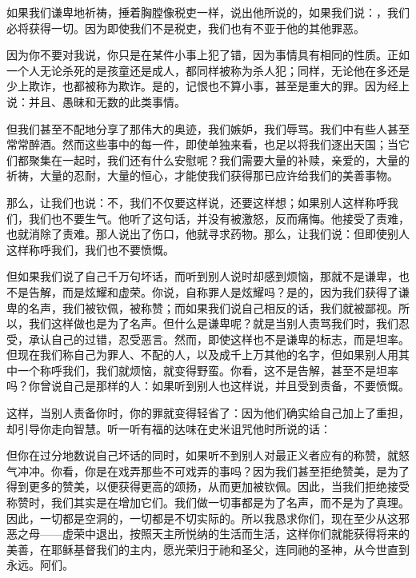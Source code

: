 如果我们谦卑地祈祷，捶着胸膛像税吏一样，说出他所说的，如果我们说：，我们必将获得一切。因为即使我们不是税吏，我们也有不亚于他的其他罪恶。\par

因为你不要对我说，你只是在某件小事上犯了错，因为事情具有相同的性质。正如一个人无论杀死的是孩童还是成人，都同样被称为杀人犯；同样，无论他在多还是少上欺诈，也都被称为欺诈。是的，记恨也不算小事，甚至是重大的罪。因为经上说：并且、愚昧和无数的此类事情。\par

但我们甚至不配地分享了那伟大的奥迹，我们嫉妒，我们辱骂。我们中有些人甚至常常醉酒。然而这些事中的每一件，即使单独来看，也足以将我们逐出天国；当它们都聚集在一起时，我们还有什么安慰呢？我们需要大量的补赎，亲爱的，大量的祈祷，大量的忍耐，大量的恒心，才能使我们获得那已应许给我们的美善事物。\par

那么，让我们也说：不，我们不仅要这样说，还要这样想；如果别人这样称呼我们，我们也不要生气。他听了这句话，并没有被激怒，反而痛悔。他接受了责难，也就消除了责难。那人说出了伤口，他就寻求药物。那么，让我们说：但即使别人这样称呼我们，我们也不要愤慨。\par

但如果我们说了自己千万句坏话，而听到别人说时却感到烦恼，那就不是谦卑，也不是告解，而是炫耀和虚荣。你说，自称罪人是炫耀吗？是的，因为我们获得了谦卑的名声，我们被钦佩，被称赞；而如果我们说自己相反的话，我们就被鄙视。所以，我们这样做也是为了名声。但什么是谦卑呢？就是当别人责骂我们时，我们忍受，承认自己的过错，忍受恶言。然而，即使这样也不是谦卑的标志，而是坦率。但现在我们称自己为罪人、不配的人，以及成千上万其他的名字，但如果别人用其中一个称呼我们，我们就烦恼，就变得野蛮。你看，这不是告解，甚至不是坦率吗？你曾说自己是那样的人：如果听到别人也这样说，并且受到责备，不要愤慨。\par

这样，当别人责备你时，你的罪就变得轻省了：因为他们确实给自己加上了重担，却引导你走向智慧。听一听有福的达味在史米诅咒他时所说的话：\par

但你在过分地数说自己坏话的同时，如果听不到别人对最正义者应有的称赞，就怒气冲冲。你看，你是在戏弄那些不可戏弄的事吗？因为我们甚至拒绝赞美，是为了得到更多的赞美，以便获得更高的颂扬，从而更加被钦佩。因此，当我们拒绝接受称赞时，我们其实是在增加它们。我们做一切事都是为了名声，而不是为了真理。因此，一切都是空洞的，一切都是不切实际的。所以我恳求你们，现在至少从这邪恶之母——虚荣中退出，按照天主所悦纳的生活而生活，这样你们就能获得将来的美善，在耶稣基督我们的主内，愿光荣归于祂和圣父，连同祂的圣神，从今世直到永远。阿们。\par

